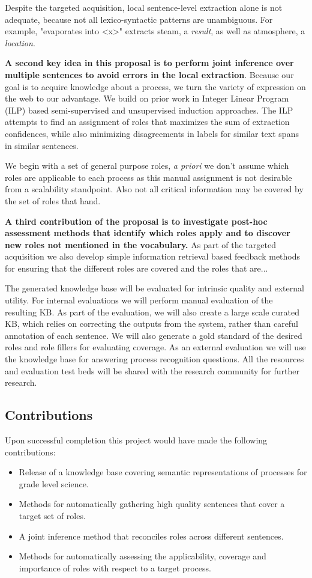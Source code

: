 Despite the targeted acquisition, local sentence-level extraction alone is not adequate, because not all lexico-syntactic patterns are unambiguous. 
For example, "evaporates into <x>" extracts steam, a {\em result}, as well as atmosphere, a {\em location}. 

{\bf A second key idea in this proposal is to perform joint inference over multiple sentences to avoid errors in the local extraction}.
Because our goal is to acquire knowledge about a process, we turn the variety of expression on the web to our advantage. 
We build on prior work in Integer Linear Program (ILP) based semi-supervised and unsupervised induction approaches. 
The ILP attempts to find an assignment of roles that maximizes the sum of extraction confidences, 
while also minimizing disagreements in labels for similar text spans in similar sentences.

We begin with a set of general purpose roles, {\em a priori} we don't assume which roles are applicable to each process as this manual assignment is not desirable from a scalability standpoint.
Also not all critical information may be covered by the set of roles that hand.

{\bf A third contribution of the proposal is to investigate post-hoc assessment methods that identify which roles apply and to discover new roles not mentioned in the vocabulary.}
As part of the targeted acquisition we also develop simple information retrieval based feedback methods for ensuring that the different roles are covered and the roles that are...

The generated knowledge base will be evaluated for intrinsic quality and external utility. For internal evaluations we will perform manual evaluation of the resulting KB. As part of the evaluation, we will also create a large scale curated KB, which relies on correcting the outputs from the system, rather than careful annotation of each sentence. We will also generate a gold standard of the desired roles and role fillers for evaluating coverage. As an external evaluation we will use the knowledge base for answering process recognition questions. All the resources and evaluation test beds will be shared with the research community for further research.
	

\subsection{Contributions}

Upon successful completion this project would have made the following contributions:
\begin{itemize}
\item Release of a knowledge base covering semantic representations of processes for grade level science.
\item Methods for automatically gathering high quality sentences that cover a target set of roles. 
\item A joint inference method that reconciles roles across different sentences.  
\item Methods for automatically assessing the applicability, coverage and importance of roles with respect to a target process.
\end{itemize}

